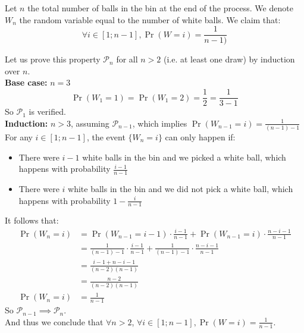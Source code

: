 \providecommand{\f}[2]{\ensuremath{\frac{#1}{#2}}}

Let $n$ the total number of balls in the bin at the end of the process. We denote $W_n$ the random variable equal to the number of white balls. We claim that:
\[
  \forall i \in [1; n-1], \Pr(W = i) = \f{1}{n - 1)}
\]

Let us prove this property $\mathcal{P}_n$ for all $n > 2$ (i.e. at least one draw) by induction over $n$.\\

\noindent
\textbf{Base case:} $n = 3$\\
\[
    \Pr(W_1 = 1) = \Pr(W_1 = 2) = \f{1}{2} = \f{1}{3 - 1}
\]
So $\mathcal{P}_1$ is verified.\\

\noindent
\textbf{Induction:} $n > 3$, assuming $\mathcal{P}_{n-1}$, which implies $\Pr(W_{n-1} = i) = \f{1}{(n - 1) - 1}$\\
For any $i \in [1; n-1]$, the event $\{W_n = i\}$ can only happen if:
\begin{itemize}
  \item There were $i - 1$ white balls in the bin and we picked a white ball, which happens with probability $\f{i - 1}{n - 1}$
  \item There were $i$ white balls in the bin and we did not pick a white ball, which happens with probability $1 - \f{i}{n - 1}$
\end{itemize}

\noindent
It follows that:
\[
  \begin{array}{ll}
    \Pr(W_n = i) & = \Pr(W_{n-1} = i - 1) \cdot \f{i - 1}{n - 1} + \Pr(W_{n-1} = i) \cdot \f{n - i - 1}{n - 1} \\
                 & = \f{1}{(n - 1) - 1} \cdot \f{i - 1}{n - 1} + \f{1}{(n - 1) - 1} \cdot \f{n - i - 1}{n - 1} \\
                 & = \f{i - 1 + n - i - 1}{(n - 2)(n-1)} \\
                 & = \f{n - 2}{(n - 2)(n-1)}\\
    \Pr(W_n = i) & = \f{1}{n - 1}
  \end{array}
\]
So $\mathcal{P}_{n-1} \implies \mathcal{P}_{n}$.\\

\noindent
And thus we conclude that $\forall n > 2$, $\forall i \in [1; n-1], \Pr(W = i) = \f{1}{n - 1}$.
